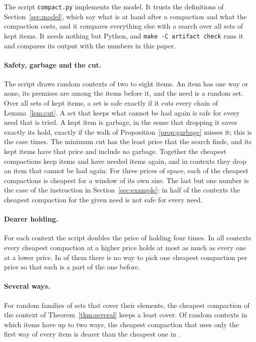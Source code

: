 \documentclass[acmsmall,nonacm,screen]{acmart}
\newcommand{\claim}[2]{#2}
\begin{document}
The script \texttt{compact.py} implements the model. It trusts the definitions of
Section~\ref{sec:model}, which say what is at hand after a compaction and what the
compaction costs, and it compares everything else with a search over all sets of kept items.
It needs nothing but Python, and \texttt{make -C artifact check} runs it and compares its
output with the numbers in this paper.

\paragraph{Safety, garbage and the cut.} The script draws \exContexts{} random contexts of
two to eight items. An item has one way or none, its premises are among the items before it,
and the need is a random set. \claim{single}{Over all \exSets{} sets of kept items, a set is
safe exactly if it cuts every chain of Lemma~\ref{lem:cut}. A set that keeps what cannot be
had again is safe for every need that is tried. A kept item is garbage, in the sense that
dropping it saves exactly its hold, exactly if the walk of Proposition~\ref{prop:garbage}
misses it; this is the case \exGarbage{} times. The minimum cut has the least price that the
search finds, and its kept items have that price and include no garbage. Together the
cheapest compactions keep \exKept{} items and have \exAgain{} needed items again, and in
\exPinsDropped{} contexts they drop an item that cannot be had again. For three prices of
space, each of the \exWindows{} cheapest compactions is cheapest for a window of its own
size.} The last but one number is the case of the instruction in Section~\ref{sec:example}:
in half of the contexts the cheapest compaction for the given need is not safe for every
need.

\paragraph{Dearer holding.} \claim{ladder}{For each context the script doubles the price of
holding four times. In all \exLadders{} contexts every cheapest compaction at a higher price
holds at most as much as every one at a lower price. In \exNotNested{} of them there is no
way to pick one cheapest compaction per price so that each is a part of the one before.}

\paragraph{Several ways.} \claim{several}{For \exCovers{} random families of sets that
cover their elements, the cheapest compaction of the context of Theorem~\ref{thm:several}
keeps a least cover. Of \exSeveral{} random contexts in which items have up to two ways, the
cheapest compaction that uses only the first way of every item is dearer than the cheapest
one in \exFirstDearer{}.}
\end{document}
